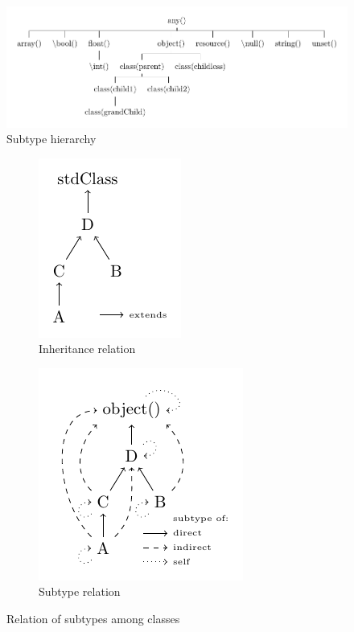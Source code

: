 \documentclass[../main.tex]{subfiles}
\begin{document}
    \begin{figure}[H]
        \includegraphics{Diagrams/Subtypes.pdf}
        \caption{Subtype hierarchy}
        \label{fig:subtypes}
    \end{figure}
 
    \begin{figure}
    \begin{subfigure}{.24\textwidth}
      \begin{center}
      \includegraphics[scale=1.25]{Diagrams/Inheritance_example.pdf}
      \caption{Inheritance relation}
      \label{fig:subtype}
      \end{center}
    \end{subfigure}
    \begin{subfigure}{.24\textwidth}
      \begin{center}
      \includegraphics[scale=1.25]{Diagrams/Subtypes_example.pdf}
      \caption{Subtype relation}
      \label{subtype_tc}
      \end{center}
    \end{subfigure}
    
    \caption{Relation of subtypes among classes}
    \label{fig:subtypes}
    \end{figure}
\end{document}

